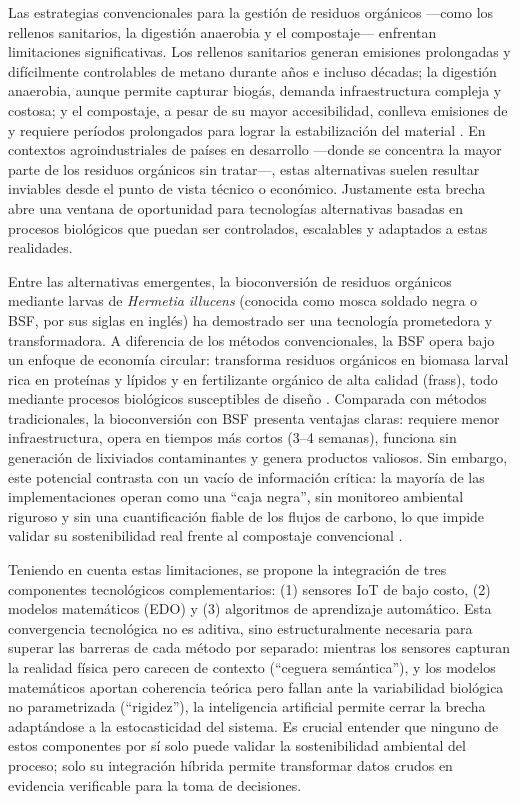 Las estrategias convencionales para la gestión de residuos orgánicos ---como los rellenos sanitarios, la digestión anaerobia y el compostaje--- enfrentan limitaciones significativas. Los rellenos sanitarios generan emisiones prolongadas y difícilmente controlables de metano durante años e incluso décadas; la digestión anaerobia, aunque permite capturar biogás, demanda infraestructura compleja y costosa; y el compostaje, a pesar de su mayor accesibilidad, conlleva emisiones de  y requiere períodos prolongados para lograr la estabilización del material \cite{kongEvaluatingGreenhouseGas2012, nordahlGreenhouseGasAir2023a}. En contextos agroindustriales de países en desarrollo ---donde se concentra la mayor parte de los residuos orgánicos sin tratar---, estas alternativas suelen resultar inviables desde el punto de vista técnico o económico. Justamente esta brecha abre una ventana de oportunidad para tecnologías alternativas basadas en procesos biológicos que puedan ser controlados, escalables y adaptados a estas realidades.

Entre las alternativas emergentes, la bioconversión de residuos orgánicos mediante larvas de \textit{Hermetia illucens} (conocida como mosca soldado negra o BSF, por sus siglas en inglés) ha demostrado ser una tecnología prometedora y transformadora. A diferencia de los métodos convencionales, la BSF opera bajo un enfoque de economía circular: transforma residuos orgánicos en biomasa larval rica en proteínas y lípidos y en fertilizante orgánico de alta calidad (frass), todo mediante procesos biológicos susceptibles de diseño \cite{bermudez-serranoComprehensiveUtilizationBlack2023, surendraBioconversionOrganicWastes2016}. Comparada con métodos tradicionales, la bioconversión con BSF presenta ventajas claras: requiere menor infraestructura, opera en tiempos más cortos (3--4 semanas), funciona sin generación de lixiviados contaminantes y genera productos valiosos. Sin embargo, este potencial contrasta con un vacío de información crítica: la mayoría de las implementaciones operan como una ``caja negra'', sin monitoreo ambiental riguroso y sin una cuantificación fiable de los flujos de carbono, lo que impide validar su sostenibilidad real frente al compostaje convencional \cite{jenkinsProcessingPoultryManure2025}.

Teniendo en cuenta estas limitaciones, se propone la integración de tres componentes tecnológicos complementarios: (1) sensores IoT de bajo costo, (2) modelos matemáticos (EDO) y (3) algoritmos de aprendizaje automático. Esta convergencia tecnológica no es aditiva, sino estructuralmente necesaria para superar las barreras de cada método por separado: mientras los sensores capturan la realidad física pero carecen de contexto (``ceguera semántica''), y los modelos matemáticos aportan coherencia teórica pero fallan ante la variabilidad biológica no parametrizada (``rigidez''), la inteligencia artificial permite cerrar la brecha adaptándose a la estocasticidad del sistema. Es crucial entender que ninguno de estos componentes por sí solo puede validar la sostenibilidad ambiental del proceso; solo su integración híbrida permite transformar datos crudos en evidencia verificable para la toma de decisiones.

